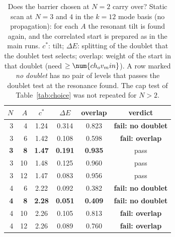 \begin{table}[ht]
\centering
\small
\caption{Does the barrier chosen at $N=2$ carry over? Static scan at $N=3$ and $4$ in the $k=12$ mode basis (no propagation): for each $A$ the resonant tilt is found again, and the correlated start is prepared as in the main runs. $c^*$: tilt; $\Delta E$: splitting of the doublet that the doublet test selects; overlap: weight of the start in that doublet (need $\ge\num{ch_ov_min}$). A row marked \emph{no doublet} has no pair of levels that passes the doublet test at the resonance found. The cap test of Table~\ref{tab:choice} was not repeated for $N>2$.}
\label{tab:Ascan}
\begin{tabular}{rrcccc}
\toprule
$N$ & $A$ & $c^*$ & $\Delta E$ & overlap & verdict \\
\midrule
3 & 4 & 1.24 & 0.314 & 0.823 & \textbf{fail: no doublet} \\
3 & 6 & 1.42 & 0.108 & 0.598 & \textbf{fail: overlap} \\
\textbf{3} & \textbf{8} & \textbf{1.47} & \textbf{0.191} & \textbf{0.935} & pass \\
3 & 10 & 1.48 & 0.125 & 0.960 & pass \\
3 & 12 & 1.47 & 0.083 & 0.956 & pass \\
\midrule
4 & 6 & 2.22 & 0.092 & 0.382 & \textbf{fail: no doublet} \\
\textbf{4} & \textbf{8} & \textbf{2.28} & \textbf{0.051} & \textbf{0.409} & \textbf{fail: no doublet} \\
4 & 10 & 2.26 & 0.105 & 0.813 & \textbf{fail: overlap} \\
4 & 12 & 2.26 & 0.089 & 0.760 & \textbf{fail: overlap} \\
\bottomrule
\end{tabular}
\end{table}
